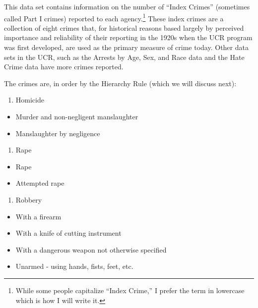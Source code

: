 \documentclass[
]{krantz}
\providecommand{\tightlist}{%
  \setlength{\itemsep}{0pt}\setlength{\parskip}{0pt}}
\begin{document}
This data set contains information on the number of ``Index
Crimes'' (sometimes called Part I crimes) reported to each
agency.\footnote{While some people capitalize ``Index
  Crime,'' I prefer the term in lowercase which is how I
  will write it.} These index crimes are a collection of
eight crimes that, for historical reasons based largely by
perceived importance and reliability of their reporting in
the 1920s when the UCR program was first developed, are used
as the primary measure of crime today. Other data sets in
the UCR, such as the Arrests by Age, Sex, and Race data and
the Hate Crime data have more crimes reported.

The crimes are, in order by the Hierarchy Rule (which we
will discuss next):

\begin{enumerate}
\def\labelenumi{\arabic{enumi}.}
\tightlist
\item
  Homicide\\
\end{enumerate}

\begin{itemize}
\tightlist
\item
  Murder and non-negligent manslaughter\\
\item
  Manslaughter by negligence
\end{itemize}

\begin{enumerate}
\def\labelenumi{\arabic{enumi}.}
\setcounter{enumi}{1}
\tightlist
\item
  Rape\\
\end{enumerate}

\begin{itemize}
\tightlist
\item
  Rape\\
\item
  Attempted rape\\
\end{itemize}

\begin{enumerate}
\def\labelenumi{\arabic{enumi}.}
\setcounter{enumi}{2}
\tightlist
\item
  Robbery\\
\end{enumerate}

\begin{itemize}
\tightlist
\item
  With a firearm\\
\item
  With a knife of cutting instrument\\
\item
  With a dangerous weapon not otherwise specified\\
\item
  Unarmed - using hands, fists, feet, etc.\\
\end{itemize}
\end{document}
